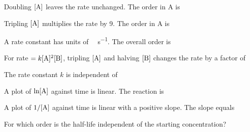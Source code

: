 \documentclass{apchem-exam}
\begin{document}
\begin{mcq}
  Doubling $[\ce{A}]$ leaves the rate unchanged. The order in A is
  \choices
\end{mcq}

\begin{mcq}
  Tripling $[\ce{A}]$ multiplies the rate by 9. The order in A is
  \choices
\end{mcq}

\begin{mcq}
  A rate constant has units of \si{\per\Molar\per\second}. The overall
  order is
  \choices
\end{mcq}

\begin{mcq}
  For rate $= k[\ce{A}]^2[\ce{B}]$, tripling $[\ce{A}]$ and halving
  $[\ce{B}]$ changes the rate by a factor of
  \choices
\end{mcq}

\begin{mcq}
  The rate constant $k$ is independent of
  \choices
\end{mcq}

\begin{mcq}
  A plot of $\ln[\ce{A}]$ against time is linear. The reaction is
  \choices
\end{mcq}

\begin{mcq}
  A plot of $1/[\ce{A}]$ against time is linear with a positive slope. The
  slope equals
  \choices
\end{mcq}

\begin{mcq}
  For which order is the half-life independent of the starting
  concentration?
  \choices
\end{mcq}
\end{document}
